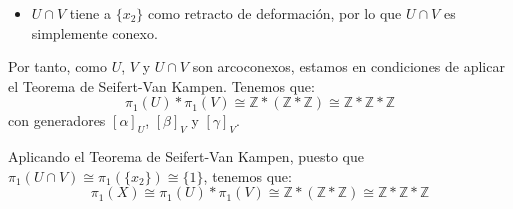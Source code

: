 \begin{ejercicio}
\begin{enumerate}[label=\alph*)]
\begin{itemize}
\begin{itemize}
                    \item $Z$ tiene a $S_{-2}$ como retracto de deformación, por lo que es arcoconexo y $\pi_1(Z)\cong \mathbb{Z}$. Un generador de $\pi_1(Z)$ es $[\gamma]_Z$, donde $\gamma$ es un lazo que recorre la circunferencia $S_{-2}$ una vez en sentido antihorario.
                    \item $W\cap Z$ tiene a $\{x_1\}$ como retracto de deformación, luego $W\cap Z$ es simplemente conexo.
                \end{itemize}

                Como $W$, $Z$ y $W\cap Z$ son arcoconexos, estamos en condiciones de aplicar el Teorema de Seifert-Van Kampen. Tenemos que:
                \begin{equation*}
                    \pi_1(W)\ast \pi_1(Z) \cong \mathbb{Z}\ast \mathbb{Z}
                \end{equation*}
                con generadores $[\beta]_W$ y $[\gamma]_Z$.

                Por el Teorema de Seifert-Van Kampen, puesto que $\pi_1(W\cap Z) \cong \pi_1(\{x_1\})$ es trivial, tenemos que:
                \begin{equation*}
                    \pi_1(Y) \cong \pi_1(W)\ast \pi_1(Z) \cong \mathbb{Z}\ast \mathbb{Z}
                \end{equation*}

                Además, $Y$ es arcoconexo, como unión de dos conjuntos arcoconexos con intersección no vacía.
                \item $U\cap V$ tiene a $\{x_2\}$ como retracto de deformación, por lo que $U\cap V$ es simplemente conexo.
            \end{itemize}

            Por tanto, como $U$, $V$ y $U\cap V$ son arcoconexos, estamos en condiciones de aplicar el Teorema de Seifert-Van Kampen. Tenemos que:
            \begin{equation*}
                \pi_1(U)\ast \pi_1(V) \cong \mathbb{Z}\ast (\mathbb{Z}\ast \mathbb{Z}) \cong \mathbb{Z}\ast \mathbb{Z}\ast \mathbb{Z}
            \end{equation*}
            con generadores $[\alpha]_U$, $[\beta]_V$ y $[\gamma]_V$.

            Aplicando el Teorema de Seifert-Van Kampen, puesto que $\pi_1(U\cap V) \cong \pi_1(\{x_2\}) \cong \{1\}$, tenemos que:
            \begin{equation*}
                \pi_1(X) \cong \pi_1(U)\ast \pi_1(V) \cong \mathbb{Z}\ast (\mathbb{Z}\ast \mathbb{Z}) \cong \mathbb{Z}\ast \mathbb{Z}\ast \mathbb{Z}
            \end{equation*}


\end{enumerate}
\end{ejercicio}
